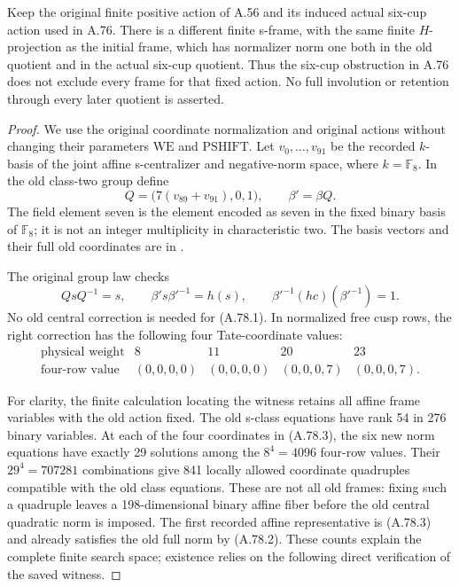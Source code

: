 Keep the original finite positive action of A.56 and its induced
actual six-cup action used in A.76. There is a different finite
s-frame, with the same finite \(H\)-projection as the initial frame, which has normalizer
norm one both in the old quotient and in the actual six-cup
quotient. Thus the six-cup obstruction in A.76 does not exclude
every frame for that fixed action. No full involution or retention
through every later quotient is asserted.

\begin{proof}
We use the original coordinate normalization and original actions
without changing their parameters \(\mathrm{WE}\) and
\(\mathrm{PSHIFT}\). Let \(v_0,\ldots,v_{91}\) be the recorded
\(k\)-basis of the joint affine s-centralizer and negative-norm
space, where \(k=\mathbb F_8\). In the old class-two group define
\[
             Q=\bigl(7(v_{89}+v_{91}),0,1\bigr),
             \qquad \beta'=\beta Q.
 \tag{A.78.1}
\]
The field element seven is the element encoded as seven in the
fixed binary basis of \(\mathbb F_8\); it is not an integer
multiplicity in characteristic two. The basis vectors and their
full old coordinates are in
.

The original group law checks
\[
 QsQ^{-1}=s,\qquad
 \beta's\beta'^{-1}=h(s),\qquad
 \beta'^{-1}(hc)(\beta'^{-1})=1.
 \tag{A.78.2}
\]
No old central correction is needed for (A.78.1). In normalized
free cusp rows, the right correction has the following four
Tate-coordinate values:
\[
\begin{array}{c|cccc}
 \text{physical weight}&8&11&20&23\\ \hline
 \text{four-row value}&(0,0,0,0)&(0,0,0,0)&(0,0,0,7)&(0,0,0,7).
\end{array}
 \tag{A.78.3}
\]

For clarity, the finite calculation locating the witness retains
all affine frame variables with the old action fixed. The old
s-class equations have rank 54 in 276 binary variables. At each
of the four coordinates in (A.78.3), the six new norm equations
have exactly 29 solutions among the \(8^4=4096\) four-row values.
Their \(29^4=707281\) combinations give 841 locally allowed
coordinate quadruples compatible with the old class equations.
These are not all old frames: fixing such a quadruple leaves
a 198-dimensional binary affine fiber before the old central
quadratic norm is imposed. The first recorded affine representative
is (A.78.3) and already satisfies
the old full norm by (A.78.2). These counts explain the complete
finite search space; existence relies on the following direct
verification of the saved witness.


\end{proof}

